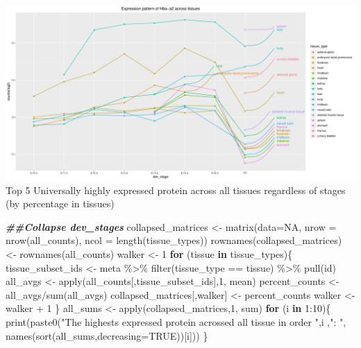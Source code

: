 \documentclass[
]{article}
\newenvironment{Shaded}{\begin{snugshade}}{\end{snugshade}}
\newcommand{\AttributeTok}[1]{\textcolor[rgb]{0.77,0.63,0.00}{#1}}
\newcommand{\ConstantTok}[1]{\textcolor[rgb]{0.00,0.00,0.00}{#1}}
\newcommand{\ControlFlowTok}[1]{\textcolor[rgb]{0.13,0.29,0.53}{\textbf{#1}}}
\newcommand{\DecValTok}[1]{\textcolor[rgb]{0.00,0.00,0.81}{#1}}
\newcommand{\DocumentationTok}[1]{\textcolor[rgb]{0.56,0.35,0.01}{\textbf{\textit{#1}}}}
\newcommand{\FunctionTok}[1]{\textcolor[rgb]{0.00,0.00,0.00}{#1}}
\newcommand{\NormalTok}[1]{#1}
\newcommand{\OtherTok}[1]{\textcolor[rgb]{0.56,0.35,0.01}{#1}}
\newcommand{\SpecialCharTok}[1]{\textcolor[rgb]{0.00,0.00,0.00}{#1}}
\newcommand{\StringTok}[1]{\textcolor[rgb]{0.31,0.60,0.02}{#1}}
\begin{document}
\includegraphics{Exploration_files/figure-latex/unnamed-chunk-6-1.pdf}
Top 5 Universally highly expressed protein across all tissues regardless
of stages (by percentage in tissues)

\begin{Shaded}
\begin{Highlighting}[]
\DocumentationTok{\#\#Collapse dev\_stages}
\NormalTok{collapsed\_matrices }\OtherTok{\textless{}{-}} \FunctionTok{matrix}\NormalTok{(}\AttributeTok{data=}\ConstantTok{NA}\NormalTok{, }\AttributeTok{nrow =} \FunctionTok{nrow}\NormalTok{(all\_counts), }\AttributeTok{ncol =} \FunctionTok{length}\NormalTok{(tissue\_types))}
\FunctionTok{rownames}\NormalTok{(collapsed\_matrices) }\OtherTok{\textless{}{-}} \FunctionTok{rownames}\NormalTok{(all\_counts)}
\NormalTok{walker }\OtherTok{\textless{}{-}} \DecValTok{1}
\ControlFlowTok{for}\NormalTok{ (tissue }\ControlFlowTok{in}\NormalTok{ tissue\_types)\{}
\NormalTok{  tissue\_subset\_ids }\OtherTok{\textless{}{-}}\NormalTok{ meta }\SpecialCharTok{\%\textgreater{}\%} \FunctionTok{filter}\NormalTok{(tissue\_type }\SpecialCharTok{==}\NormalTok{ tissue) }\SpecialCharTok{\%\textgreater{}\%} \FunctionTok{pull}\NormalTok{(id)}
\NormalTok{  all\_avgs }\OtherTok{\textless{}{-}} \FunctionTok{apply}\NormalTok{(all\_counts[,tissue\_subset\_ids],}\DecValTok{1}\NormalTok{, mean)}
\NormalTok{  percent\_counts }\OtherTok{\textless{}{-}}\NormalTok{ all\_avgs}\SpecialCharTok{/}\FunctionTok{sum}\NormalTok{(all\_avgs)}
\NormalTok{  collapsed\_matrices[,walker] }\OtherTok{\textless{}{-}}\NormalTok{ percent\_counts}
\NormalTok{  walker }\OtherTok{\textless{}{-}}\NormalTok{ walker }\SpecialCharTok{+} \DecValTok{1}
\NormalTok{\}}
\NormalTok{all\_sums }\OtherTok{\textless{}{-}} \FunctionTok{apply}\NormalTok{(collapsed\_matrices,}\DecValTok{1}\NormalTok{, sum)}
\ControlFlowTok{for}\NormalTok{ (i }\ControlFlowTok{in} \DecValTok{1}\SpecialCharTok{:}\DecValTok{10}\NormalTok{)\{}
  \FunctionTok{print}\NormalTok{(}\FunctionTok{paste0}\NormalTok{(}\StringTok{"The highests expressed protein acrossed all tissue in order "}\NormalTok{,i ,}\StringTok{": "}\NormalTok{, }\FunctionTok{names}\NormalTok{(}\FunctionTok{sort}\NormalTok{(all\_sums,}\AttributeTok{decreasing=}\ConstantTok{TRUE}\NormalTok{))[i]))}
\NormalTok{\}}
\end{Highlighting}
\end{Shaded}
\end{document}
